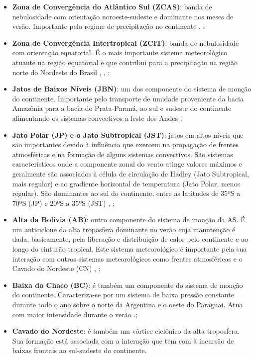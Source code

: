 \begin{itemize}
\item \textbf{Zona de Convergência do Atlântico Sul (ZCAS)}: banda de nebulosidade com orientação noroeste-sudeste e dominante nos meses de verão. Importante pelo regime de precipitação no continente \cite{kodama92a}, \cite{kodama92b};
\item \textbf{Zona de Convergência Intertropical (ZCIT)}: banda de nebulosidade com orientação equatorial. É o mais importante sistema meteorológico a\-tu\-an\-te na região equatorial e que contribui para a precipitação na região norte do Nordeste do Brasil \cite{hastenrathheller77}, \cite{uvonobre89a}, \cite{uvonobre89b};
\item \textbf{Jatos de Baixos Níveis (JBN)}: um dos componente do sistema de monção do continente. Importante pelo transporte de umidade proveniente da bacia Amazônia para a bacia do Prata-Paraná, ao sul e sudeste do continente alimentando os sistemas convectivos a leste dos Andes \cite{bonner68};
\item \textbf{Jato Polar (JP) e o Jato Subtropical (JST)}: jatos em altos níveis que são importantes devido à influência que exercem na propagação de frentes atmosféricas e na formação de alguns sistemas convectivos. São sistemas característicos onde a componente zonal do vento atinge valores máximos e geralmente são associados à célula de circulação de Hadley (Jato Subtropical, mais regular) e ao gradiente horizontal de temperatura (Jato Polar, menos regular). São dominantes ao sul do continente, entre as latitudes de 35ºS a 70ºS (JP) e  20ºS a 35ºS (JST) \cite{reiter69}, \cite{riehl69};
\item \textbf{Alta da Bolívia (AB)}: outro componente do sistema de monção da AS. É um anticiclone da alta troposfera dominante no verão cuja manutenção é dada, basicamente, pela liberação e distribuição de calor pelo continente e ao longo do cinturão tropical. Este sistema meteorológico é importante pela sua interação com outros sistemas meteorológicos como frentes atmosféricas e o Cavado do Nordeste (CN) \cite{carvalho89}, \cite{oliveira86};
\item \textbf{Baixa do Chaco (BC)}: é também um componente do sistema de monção do continente. Caracteriza-se por um sistema de baixa pressão constante durante todo o ano sobre o norte da Argentina e o oeste do Paraguai. Atua com maior intensidade durante o verão \cite{grimmetal04}.;
\item \textbf{Cavado do Nordeste}: é também um vórtice ciclônico da alta troposfera. Sua formação está associada com a interação que tem com à incursão de baixas frontais ao sul-sudeste do continente.
\end{itemize}

